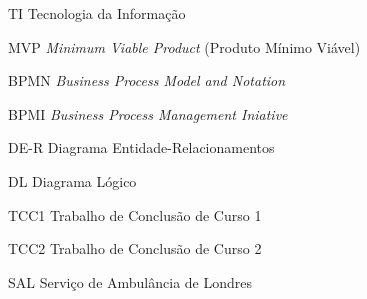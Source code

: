 \begin{siglas}
  \item[TI] Tecnologia da Informação
  \item[MVP] \textit{Minimum Viable Product} (Produto Mínimo Viável)
  \item[BPMN] \textit{Business Process Model and Notation}
  \item[BPMI] \textit{Business Process Management Iniative}
  \item[DE-R] Diagrama Entidade-Relacionamentos
  \item[DL] Diagrama Lógico
  \item[TCC1] Trabalho de Conclusão de Curso 1
  \item[TCC2] Trabalho de Conclusão de Curso 2
  \item[SAL] Serviço de Ambulância de Londres
\end{siglas}